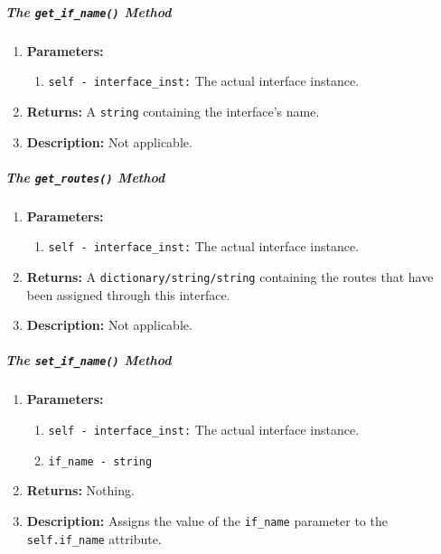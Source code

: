         \subparagraph{The \texttt{get\_if\_name()} Method}
            \begin{enumerate}
                \item \textbf{Parameters:}
                \begin{enumerate}
                    \item \texttt{self - interface\_inst:} The actual interface instance.
                \end{enumerate}
                \item \textbf{Returns:} A \texttt{string} containing the interface's name.
                \item \textbf{Description:} Not applicable.
            \end{enumerate}

        \subparagraph{The \texttt{get\_routes()} Method}
            \begin{enumerate}
                \item \textbf{Parameters:}
                \begin{enumerate}
                    \item \texttt{self - interface\_inst:} The actual interface instance.
                \end{enumerate}
                \item \textbf{Returns:} A \texttt{dictionary/string/string} containing the routes that have been assigned through this interface.
                \item \textbf{Description:} Not applicable.
            \end{enumerate}

        \subparagraph{The \texttt{set\_if\_name()} Method}
            \begin{enumerate}
                \item \textbf{Parameters:}
                \begin{enumerate}
                    \item \texttt{self - interface\_inst:} The actual interface instance.
                    \item \texttt{if\_name - string}
                \end{enumerate}
                \item \textbf{Returns:} Nothing.
                \item \textbf{Description:} Assigns the value of the \texttt{if\_name} parameter to the \texttt{self.if\_name} attribute.
            \end{enumerate}

